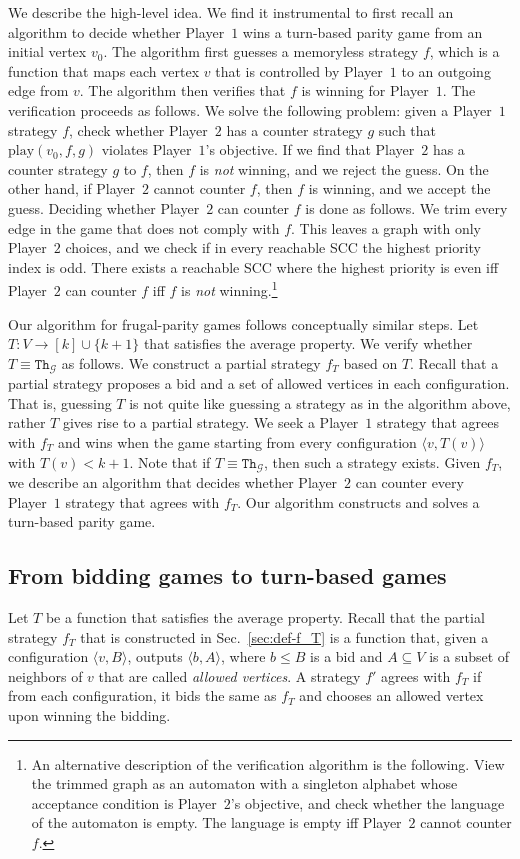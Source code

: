 \documentclass{theoretics}
\newcommand{\PO}{Player~$1$\xspace}
\newcommand{\PT}{Player~$2$\xspace}
\newcommand{\G}{{\mathcal G}}
\newcommand{\thresh}{\texttt{Th}\xspace}
\newcommand{\play}{\text{play}\xspace}
\newcommand{\zug}[1]{\langle #1  \rangle}
\begin{document}
We describe the high-level idea. We find it instrumental to first recall an \NP algorithm to decide whether \PO wins a turn-based parity game from an initial vertex $v_0$. %
The algorithm first guesses a memoryless strategy $f$, which is a function that maps each vertex $v$ that is controlled by \PO to an outgoing edge from $v$. The algorithm then verifies that $f$ is winning for \PO. 
The verification proceeds as follows. We solve the following problem: given a \PO strategy $f$, check whether \PT has a counter strategy $g$ such that $\play(v_0, f, g)$ violates \PO's objective. If we find that \PT has a counter strategy $g$ to $f$, then $f$ is {\em not} winning, and we reject the guess. On the other hand, if \PT cannot counter $f$, then $f$ is winning, and we accept the guess. Deciding whether \PT can counter $f$ is done as follows. We trim every edge in the game that does not comply with $f$. This leaves a graph with only \PT choices, and we check if in every reachable SCC the highest priority index is odd. 
There exists a reachable SCC where the highest priority is even iff \PT can counter $f$ iff $f$ is {\em not} winning.\footnote{An alternative description of the verification algorithm is the following. View the trimmed graph as an automaton with a singleton alphabet whose acceptance condition is \PT's objective, and check whether the language of the automaton is empty. The language is empty iff \PT cannot counter $f$.} 


Our algorithm for frugal-parity games follows conceptually similar steps. Let \(T : V \rightarrow [k] \cup \{k+1\}\) that satisfies the average property. 
We verify whether \(T \equiv \thresh_\G\) as follows. We construct a partial strategy $f_T$ based on $T$. Recall that a partial strategy proposes a bid and a set of allowed vertices in each configuration. That is, guessing $T$ is not quite like guessing a strategy as in the algorithm above, rather $T$ gives rise to a partial strategy. 
We seek a \PO strategy that agrees with $f_T$ and wins when the game starting from every configuration $\zug{v, T(v)}$ with $T(v) < k+1$. 
Note that if $T \equiv \thresh_\G$, then such a strategy exists. 
Given $f_T$, we describe an algorithm that decides whether \PT can counter every \PO strategy that agrees with $f_T$. Our algorithm constructs and solves a turn-based parity game. 


\subsection{From bidding games to turn-based games}
Let  \(T\) be a function that satisfies the average property. Recall that the partial strategy \(f_T\) that is constructed in Sec.~\ref{sec:def-f_T} is a function that, given a configuration $\zug{v, B}$, outputs $\zug{b, A}$, where $b \leq B$ is a bid and $A \subseteq V$ is a subset of neighbors of $v$ that are called {\em allowed vertices}. A strategy $f'$ agrees with $f_T$ if from each configuration, it bids the same as $f_T$ and chooses an allowed vertex upon winning the bidding. 
\end{document}

